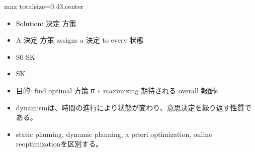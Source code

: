 \clearpage
{}
\begin{minipage}[t]{0.405\textwidth}
\begin{adjustbox}{max totalsize={\textwidth}{0.43\textheight},center}
\begin{minipage}{\textwidth}\scriptsize
{}\begin{itemize}
\item Solution: 決定 方策
\item A 決定 方策 assigns a 決定 to every 状態
\item S0 SK
\item SK
\item 目的: find optimal 方策 𝜋 ∗ maximizing 期待される overall 報酬s
\end{itemize}\begin{itemize}
\item dynamismは、時間の進行により状態が変わり、意思決定を繰り返す性質である。
\item static planning, dynamic planning, a priori optimization, online reoptimizationを区別する。
\end{itemize}
\end{minipage}
\end{adjustbox}
\end{minipage}\hfill
